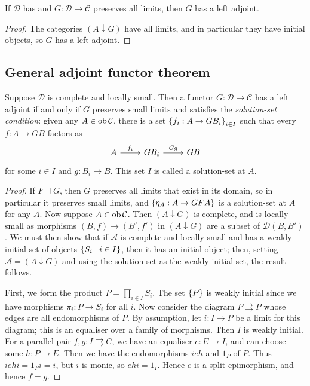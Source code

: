 \begin{proposition}
    If \( \mathcal D \) has and \( G : \mathcal D \to \mathcal C \) preserves all limits, then \( G \) has a left adjoint.
\end{proposition}
\begin{proof}
    The categories \( (A \downarrow G) \) have all limits, and in particular they have initial objects, so \( G \) has a left adjoint.
\end{proof}

\subsection{General adjoint functor theorem}
\begin{theorem}
    Suppose \( \mathcal D \) is complete and locally small.
    Then a functor \( G : \mathcal D \to \mathcal C \) has a left adjoint if and only if \( G \) preserves small limits and satisfies the \emph{solution-set condition}: given any \( A \in \operatorname{ob} \mathcal C \), there is a set \( \qty{f_i : A \to GB_i}_{i \in I} \) such that every \( f : A \to GB \) factors as
\[\begin{tikzcd}
	A & {GB_i} & GB
	\arrow["{f_i}", from=1-1, to=1-2]
	\arrow["Gg", from=1-2, to=1-3]
\end{tikzcd}\]
    for some \( i \in I \) and \( g : B_i \to B \).
    This set \( I \) is called a solution-set at \( A \).
\end{theorem}
\begin{proof}
    If \( F \dashv G \), then \( G \) preserves all limits that exist in its domain, so in particular it preserves small limits, and \( \qty{\eta_A : A \to GFA} \) is a solution-set at \( A \) for any \( A \).
    Now suppose \( A \in \operatorname{ob} \mathcal C \).
    Then \( (A \downarrow G) \) is complete, and is locally small as morphisms \( (B, f) \to (B', f') \) in \( (A \downarrow G) \) are a subset of \( \mathcal D(B, B') \).
    We must then show that if \( \mathcal A \) is complete and locally small and has a weakly initial set of objects \( \qty{S_i \mid i \in I} \), then it has an initial object; then, setting \( \mathcal A = (A \downarrow G) \) and using the solution-set as the weakly initial set, the result follows.
    
    First, we form the product \( P = \prod_{i \in I} S_i \).
    The set \( \qty{P} \) is weakly initial since we have morphisms \( \pi_i : P \to S_i \) for all \( i \).
    Now consider the diagram \( P \rightrightarrows P \) whose edges are all endomorphisms of \( P \).
    By assumption, let \( i : I \to P \) be a limit for this diagram; this is an equaliser over a family of morphisms.
    Then \( I \) is weakly initial.
    For a parallel pair \( f, g : I \rightrightarrows C \), we have an equaliser \( e : E \to I \), and can choose some \( h : P \to E \).
    Then we have the endomorphisms \( ieh \) and \( 1_P \) of \( P \).
    Thus \( iehi = 1_P i = i \), but \( i \) is monic, so \( ehi = 1_I \).
    Hence \( e \) is a split epimorphism, and hence \( f = g \).
\end{proof}
